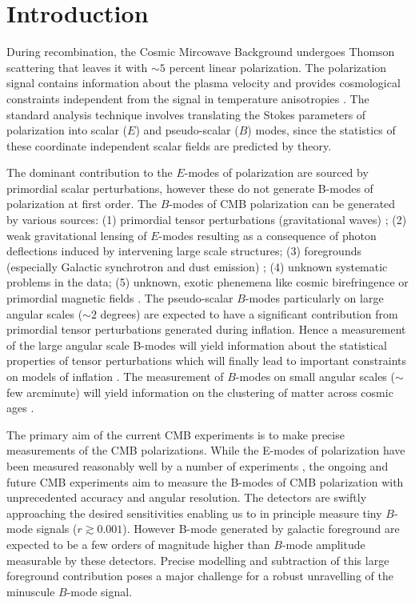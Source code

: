 \section{Introduction}
During recombination, the Cosmic Mircowave Background undergoes Thomson scattering that leaves it with $\sim 5$ percent linear polarization.  The polarization signal contains information about the plasma velocity and provides cosmological constraints independent from the signal in temperature anisotropies \citep{1997NewA....2..323H}.  The standard analysis technique involves translating the Stokes parameters of polarization into scalar ($E$) and pseudo-scalar ($B$) modes, since the statistics of these coordinate independent scalar fields are predicted by theory.   

The dominant contribution to the $E$-modes of polarization are sourced by primordial scalar perturbations, however these do not generate B-modes of polarization at first order. The $B$-modes of CMB polarization can be generated by various sources:
(1) primordial tensor perturbations (gravitational waves)%
\citep{1997PhRvD..56..596H,1997PhRvL..78.2054S};
(2) weak gravitational lensing of $E$-modes resulting as a consequence of photon deflections induced by intervening large scale structures;
(3) foregrounds (especially Galactic synchrotron and dust emission)
\citep{2016A&A...586A.133P};
(4) unknown systematic problems in the data;
(5) unknown, exotic phenemena like cosmic birefringence or primordial magnetic fields
\citep{1996ApJ...469....1K,1999PhRvL..83.1506L,2004ApJ...616....1C,2014MNRAS.438.2508P}.
 The pseudo-scalar $B$-modes particularly on large angular scales ($\sim 2$ degrees) are expected to have a significant contribution from primordial tensor perturbations generated during inflation. Hence a measurement of the large angular scale B-modes will yield information about the statistical properties of tensor perturbations which will finally lead to important constraints on models of inflation \cite{?}. The measurement of $B$-modes on small angular scales ($\sim$ few arcminute) will yield information on the clustering of matter across cosmic ages \cite{?}.
 
The primary aim of the current CMB experiments is to make precise measurements of the CMB polarizations. While the E-modes of polarization have been measured reasonably well by a number of experiments \cite{? }, the ongoing and future CMB experiments aim to measure the B-modes of CMB polarization with unprecedented accuracy and angular resolution. The detectors are swiftly approaching the desired sensitivities enabling us to in principle measure tiny $B$-mode signals ($r\gtrsim 0.001$). However B-mode generated by galactic foreground are expected to be a few orders of magnitude higher than $B$-mode amplitude measurable by these detectors. Precise modelling and subtraction of this large foreground contribution poses a major challenge for a robust unravelling of the minuscule $B$-mode signal. 

